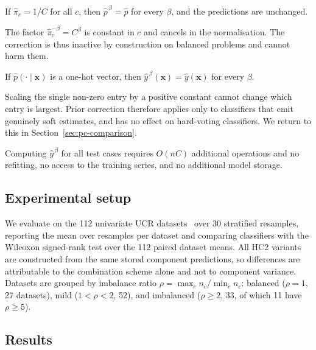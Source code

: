 \begin{proposition}
If $\hat{\pi}_c = 1/C$ for all $c$, then $\hat{p}^{\,\beta} = \hat{p}$ for every $\beta$,
and the predictions are unchanged.
\end{proposition}
\noindent The factor $\hat{\pi}_c^{-\beta} = C^{\beta}$ is constant in $c$ and cancels in
the normalisation. The correction is thus inactive by construction on balanced problems
and cannot harm them.

\begin{proposition}
\label{prop:degenerate}
If $\hat{p}(\cdot\mid\mathbf{x})$ is a one-hot vector, then $\hat{y}^{\,\beta}(\mathbf{x})
= \hat{y}(\mathbf{x})$ for every $\beta$.
\end{proposition}
\noindent Scaling the single non-zero entry by a positive constant cannot change which
entry is largest. Prior correction therefore applies only to classifiers that emit
genuinely soft estimates, and has no effect on hard-voting classifiers. We return to
this in Section~\ref{sec:pc-comparison}.

\begin{proposition}[Cost]
Computing $\hat{y}^{\,\beta}$ for all test cases requires $O(nC)$ additional operations
and no refitting, no access to the training series, and no additional model storage.
\end{proposition}

\subsection{Experimental setup}

We evaluate on the 112 univariate UCR datasets~\cite{dau2019ucr} over 30 stratified
resamples, reporting the mean over resamples per dataset and comparing classifiers with
the Wilcoxon signed-rank test over the 112 paired dataset means. All HC2 variants are
constructed from the same stored component predictions, so differences are attributable
to the combination scheme alone and not to component variance. Datasets are grouped by
imbalance ratio $\rho = \max_c n_c / \min_c n_c$: balanced ($\rho = 1$, 27 datasets),
mild ($1 < \rho < 2$, 52), and imbalanced ($\rho \geq 2$, 33, of which 11 have
$\rho \geq 5$).

\subsection{Results}

